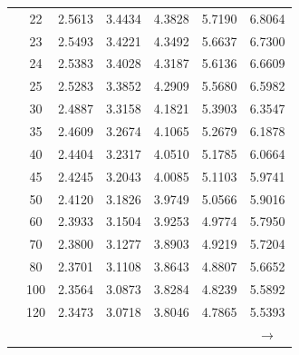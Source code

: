 \begin{minipage}{0.49\textwidth}
\begin{center}
\begin{tabular}{ccccccc}
			& 22 & 2.5613 & 3.4434 & 4.3828 & 5.7190 & 6.8064 \\
			& 23 & 2.5493 & 3.4221 & 4.3492 & 5.6637 & 6.7300 \\
			& 24 & 2.5383 & 3.4028 & 4.3187 & 5.6136 & 6.6609 \\
			& 25 & 2.5283 & 3.3852 & 4.2909 & 5.5680 & 6.5982 \\
			& 30 & 2.4887 & 3.3158 & 4.1821 & 5.3903 & 6.3547 \\
			& 35 & 2.4609 & 3.2674 & 4.1065 & 5.2679 & 6.1878 \\
			& 40 & 2.4404 & 3.2317 & 4.0510 & 5.1785 & 6.0664 \\
			& 45 & 2.4245 & 3.2043 & 4.0085 & 5.1103 & 5.9741 \\[5pt]
			& 50 & 2.4120 & 3.1826 & 3.9749 & 5.0566 & 5.9016 \\
			& 60 & 2.3933 & 3.1504 & 3.9253 & 4.9774 & 5.7950 \\
			& 70 & 2.3800 & 3.1277 & 3.8903 & 4.9219 & 5.7204 \\
			& 80 & 2.3701 & 3.1108 & 3.8643 & 4.8807 & 5.6652 \\
			& 100 & 2.3564 & 3.0873 & 3.8284 & 4.8239 & 5.5892 \\
			& 120 & 2.3473 & 3.0718 & 3.8046 & 4.7865 & 5.5393 \\
			&  &  &  &  &  & $\rightarrow$ \\
		\end{tabular}
	\end{center}
\end{minipage}

